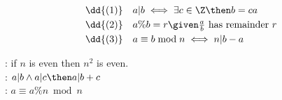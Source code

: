 \documentclass[basic, header]{nosvagor-notes}
\begin{document}
\hrulefill
\vspace{0.5em}
  \begin{center}
  \end{center}
  \vspace{-1em}
  \begin{align*}
    &\dd{(1)} \quad a|b \iff \exists c \in \Z \then b = ca \\
    &\dd{(2)} \quad a\%b = r \given \tfrac{a}{b} ~\text{has remainder}~ r \\
    &\dd{(3)} \quad a \equiv b \bmod n \iff n|b - a
  \end{align*}

  : if \(n\) is even then \(n^2\) is even. \\
  : \(a|b \land a|c \then a|b+c\) \\
  : \(a \equiv a \% n \bmod n\) \\

\hrulefill

\vspace{2em}
\end{document}
